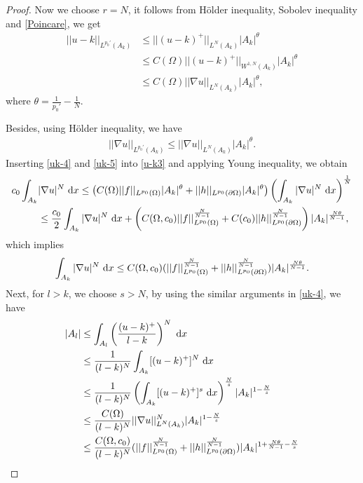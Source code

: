\documentclass[reqno, 11pt]{amsart} %
\numberwithin{equation}{section}
\theoremstyle{definition}
\newcommand{\pa}{\partial}
\newcommand{\dx}{\textup{d}x}
\begin{document}
\begin{proof}
    Now we choose $r = N$, it follows from  H\"{o}lder inequality, Sobolev inequality and \eqref{Poincare}, we get
    \begin{align}\label{uk-4}
        ||u-k||_{L^{p_0'}(A_k)} & \leq ||(u-k)^+||_{L^N(A_k)}|A_k|^{\theta} \nonumber \\
        & \leq C(\Omega)|| (u - k)^+||_{W^{1,N}(A_k)}|A_k|^{\theta} \\
        & \leq C(\Omega) ||\nabla u||_{L^{N}(A_k)}|A_k|^{\theta}, \nonumber
    \end{align}
    where $\theta = \frac{1}{p_0'} - \frac{1}{N} $. 
    
    Besides, using H\"{o}lder inequality, we have
    \begin{align}\label{uk-5}
        ||\nabla u||_{L^{p_0'}(A_k)} \leq ||\nabla u||_{L^{N}(A_k)}|A_k|^{\theta}.
    \end{align}
    Inserting \eqref{uk-4} and \eqref{uk-5} into \eqref{u-k3} and applying Young inequality, we obtain
    \begin{align*}
        c_0 \int_{A_k} & |\nabla u|^N \ \dx  \leq \left( C( \Omega) ||f||_{L^{p_0}(\Omega)} |A_k|^{\theta} + ||h||_{L^{p_0}(\pa \Omega)} |A_k|^{\theta} \right) \left( \int_{A_k} |\nabla u|^N \ \dx \right)^{\frac{1}{N}} \\
        & \leq \frac{c_0}{2}\int_{A_k} |\nabla u|^N \ \dx + \left( C( \Omega, c_0) ||f||_{L^{p_0}(\Omega)}^{\frac{N}{N-1}} + C(c_0)||h||_{L^{p_0}(\pa \Omega)}^{\frac{N}{N-1}} \right)|A_k|^{\frac{N\theta}{N-1}} ,
    \end{align*}
    which implies
    \begin{align}\label{Ln}
        \int_{A_k} |\nabla u|^N \ \dx \leq C(\Omega, c_0) (||f||_{L^{p_0}(\Omega)}^{\frac{N}{N-1}} + ||h||_{L^{p_0}(\pa \Omega)}^{\frac{N}{N-1}} ) |A_k|^{\frac{N \theta}{N-1}}.
    \end{align}
    Next, for $l > k$, we  choose $s > N$, by using the similar arguments in \eqref{uk-4}, we have
    \begin{align*}
        |A_l| & \leq \int_{A_l} \left( \frac{(u-k)^+}{l-k} \right)^N \ \dx\\
        & \leq \frac{1}{(l-k)^N} \int_{A_k} [(u-k)^+]^N \ \dx \\
        & \leq \frac{1}{(l-k)^N} \left(\int_{A_k} [(u-k)^+]^s \ \dx \right)^{\frac{N}{s}} |A_k|^{1-\frac{N}{s}} \\
        & \leq \frac{C(\Omega)}{(l-k)^N} ||\nabla u||_{L^N({A_k})}^N |A_k|^{1 - \frac{N}{s}}\\
        & \leq \frac{C(\Omega, c_0)}{(l-k)^N} (||f||_{L^{p_0}(\Omega)}^{\frac{N}{N-1}} + ||h||_{L^{p_0}(\pa \Omega)}^{\frac{N}{N-1}} )|A_k|^{1 + \frac{N \theta}{N-1} - \frac{N}{s}} \\

\end{align*}
\end{proof}
\end{document}
